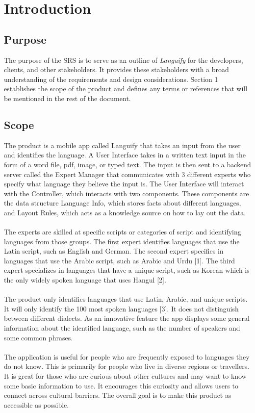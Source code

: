 \section{Introduction}
\label{sec:introduction}


\subsection{Purpose}
\label{sub:purpose}
The purpose of the SRS is to serve as an outline of \textit{Languify} for the developers, clients, and other stakeholders. It provides these stakeholders with a broad understanding of the requirements and design considerations. Section 1 establishes the scope of the product and defines any terms or references that will be mentioned in the rest of the document.


\subsection{Scope}
\label{sub:scope}
The product is a mobile app called Languify that takes an input from the user and identifies the language. 
A User Interface takes in a written text input in the form of a word file, pdf, image, or typed text. 
The input is then sent to a backend server called the Expert Manager that communicates with 3 different experts who specify what language they believe the input is. 
The User Interface will interact with the Controller, which interacts with two components.
These components are the data structure Language Info, which stores facts about different languages, and Layout Rules, which acts as a knowledge source on how to lay out the data.\\ \\
The experts are skilled at specific scripts or categories of script and identifying languages from those groups. The first expert identifies languages that use the Latin script, such as English and German. 
The second expert specifies in languages that use the Arabic script, such as Arabic and Urdu [1]. The third expert specializes in languages that have a unique script, such as Korean which is the only widely spoken language that uses Hangul [2]. \\ \\
The product only identifies languages that use Latin, Arabic, and unique scripts. It will only identify the 100 most spoken languages [3]. It does not distinguish between different dialects. As an innovative feature the app displays some general information about the identified language, such as the number of speakers and some common phrases.\\ \\
The application is useful for people who are frequently exposed to languages they do not know. This is primarily for people who live in diverse regions or travellers. It is great for those who are curious about other cultures and may want to know some basic information to use. It encourages this curiosity and allows users to connect across cultural barriers. The overall goal is to make this product as accessible as possible.


